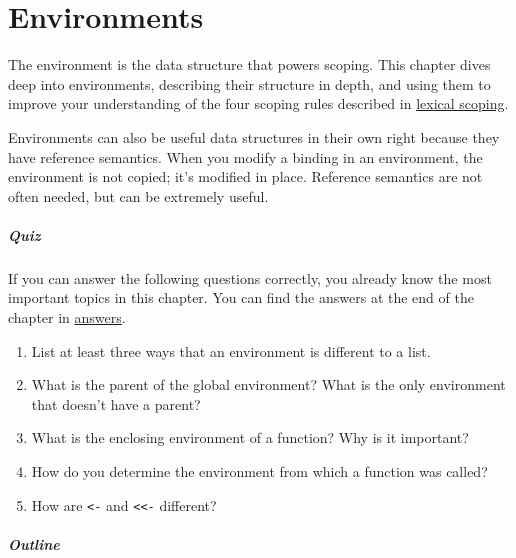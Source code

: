 \chapter{Environments}\label{environments}

The environment is the data structure that powers scoping. This chapter
dives deep into environments, describing their structure in depth, and
using them to improve your understanding of the four scoping rules
described in \hyperref[lexical-scoping]{lexical scoping}.

Environments can also be useful data structures in their own right
because they have reference semantics. When you modify a binding in an
environment, the environment is not copied; it's modified in place.
Reference semantics are not often needed, but can be extremely useful.

\paragraph{Quiz}

If you can answer the following questions correctly, you already know
the most important topics in this chapter. You can find the answers at
the end of the chapter in \hyperref[env-answers]{answers}.

\begin{enumerate}
\def\labelenumi{\arabic{enumi}.}
\item
  List at least three ways that an environment is different to a list.
\item
  What is the parent of the global environment? What is the only
  environment that doesn't have a parent?
\item
  What is the enclosing environment of a function? Why is it important?
\item
  How do you determine the environment from which a function was called?
\item
  How are \texttt{\textless{}-} and \texttt{\textless{}\textless{}-}
  different?
\end{enumerate}

\paragraph{Outline}

